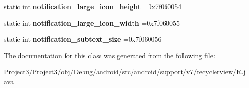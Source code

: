 \begin{DoxyCompactItemize}
\item 
\mbox{\label{classandroid_1_1support_1_1v7_1_1recyclerview_1_1R_1_1dimen_a9e34c44ff33317899dec2c2c5e6e6590}} 
static int {\bfseries notification\+\_\+large\+\_\+icon\+\_\+height} =0x7f060054
\item 
\mbox{\label{classandroid_1_1support_1_1v7_1_1recyclerview_1_1R_1_1dimen_a568149eee3074b778720857dbb4ba441}} 
static int {\bfseries notification\+\_\+large\+\_\+icon\+\_\+width} =0x7f060055
\item 
\mbox{\label{classandroid_1_1support_1_1v7_1_1recyclerview_1_1R_1_1dimen_a6d546b2a1fabb62e5f0cb9e1ac6eacf5}} 
static int {\bfseries notification\+\_\+subtext\+\_\+size} =0x7f060056
\end{DoxyCompactItemize}


The documentation for this class was generated from the following file\+:\begin{DoxyCompactItemize}
\item 
Project3/\+Project3/obj/\+Debug/android/src/android/support/v7/recyclerview/R.\+java\end{DoxyCompactItemize}

